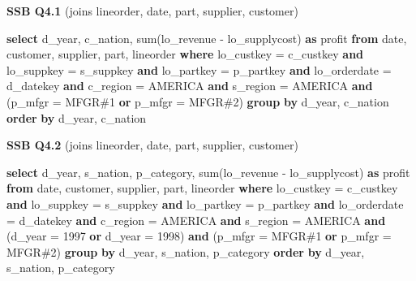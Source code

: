 \documentclass[
  10pt,
]{article}
\newenvironment{Shaded}{}{}
\newcommand{\DataTypeTok}[1]{\textcolor[rgb]{0.56,0.13,0.00}{#1}}
\newcommand{\DecValTok}[1]{\textcolor[rgb]{0.25,0.63,0.44}{#1}}
\newcommand{\FunctionTok}[1]{\textcolor[rgb]{0.02,0.16,0.49}{#1}}
\newcommand{\KeywordTok}[1]{\textcolor[rgb]{0.00,0.44,0.13}{\textbf{#1}}}
\newcommand{\NormalTok}[1]{#1}
\newcommand{\OperatorTok}[1]{\textcolor[rgb]{0.40,0.40,0.40}{#1}}
\newcommand{\StringTok}[1]{\textcolor[rgb]{0.25,0.44,0.63}{#1}}
\begin{document}
\textbf{SSB Q4.1} (joins lineorder, date, part, supplier, customer)

\begin{Shaded}
\begin{Highlighting}[]
\KeywordTok{select}\NormalTok{ d\_year, c\_nation, }\FunctionTok{sum}\NormalTok{(lo\_revenue }\OperatorTok{{-}}\NormalTok{ lo\_supplycost) }\KeywordTok{as}\NormalTok{ profit}
\KeywordTok{from} \DataTypeTok{date}\NormalTok{, customer, supplier, part, lineorder}
\KeywordTok{where}\NormalTok{ lo\_custkey }\OperatorTok{=}\NormalTok{ c\_custkey }\KeywordTok{and}\NormalTok{ lo\_suppkey }\OperatorTok{=}\NormalTok{ s\_suppkey }\KeywordTok{and}\NormalTok{ lo\_partkey }\OperatorTok{=}\NormalTok{ p\_partkey }\KeywordTok{and}\NormalTok{ lo\_orderdate }\OperatorTok{=}\NormalTok{ d\_datekey }\KeywordTok{and}\NormalTok{ c\_region }\OperatorTok{=} \StringTok{\textquotesingle{}AMERICA\textquotesingle{}} \KeywordTok{and}\NormalTok{ s\_region }\OperatorTok{=} \StringTok{\textquotesingle{}AMERICA\textquotesingle{}} \KeywordTok{and}\NormalTok{ (p\_mfgr }\OperatorTok{=} \StringTok{\textquotesingle{}MFGR\#1\textquotesingle{}} \KeywordTok{or}\NormalTok{ p\_mfgr }\OperatorTok{=} \StringTok{\textquotesingle{}MFGR\#2\textquotesingle{}}\NormalTok{)}
\KeywordTok{group} \KeywordTok{by}\NormalTok{ d\_year, c\_nation}
\KeywordTok{order} \KeywordTok{by}\NormalTok{ d\_year, c\_nation}
\end{Highlighting}
\end{Shaded}

\textbf{SSB Q4.2} (joins lineorder, date, part, supplier, customer)

\begin{Shaded}
\begin{Highlighting}[]
\KeywordTok{select}\NormalTok{ d\_year, s\_nation, p\_category, }\FunctionTok{sum}\NormalTok{(lo\_revenue }\OperatorTok{{-}}\NormalTok{ lo\_supplycost) }\KeywordTok{as}\NormalTok{ profit}
\KeywordTok{from} \DataTypeTok{date}\NormalTok{, customer, supplier, part, lineorder}
\KeywordTok{where}\NormalTok{ lo\_custkey }\OperatorTok{=}\NormalTok{ c\_custkey }\KeywordTok{and}\NormalTok{ lo\_suppkey }\OperatorTok{=}\NormalTok{ s\_suppkey }\KeywordTok{and}\NormalTok{ lo\_partkey }\OperatorTok{=}\NormalTok{ p\_partkey }\KeywordTok{and}\NormalTok{ lo\_orderdate }\OperatorTok{=}\NormalTok{ d\_datekey }\KeywordTok{and}\NormalTok{ c\_region }\OperatorTok{=} \StringTok{\textquotesingle{}AMERICA\textquotesingle{}} \KeywordTok{and}\NormalTok{ s\_region }\OperatorTok{=} \StringTok{\textquotesingle{}AMERICA\textquotesingle{}} \KeywordTok{and}\NormalTok{ (d\_year }\OperatorTok{=} \DecValTok{1997} \KeywordTok{or}\NormalTok{ d\_year }\OperatorTok{=} \DecValTok{1998}\NormalTok{) }\KeywordTok{and}\NormalTok{ (p\_mfgr }\OperatorTok{=} \StringTok{\textquotesingle{}MFGR\#1\textquotesingle{}} \KeywordTok{or}\NormalTok{ p\_mfgr }\OperatorTok{=} \StringTok{\textquotesingle{}MFGR\#2\textquotesingle{}}\NormalTok{)}
\KeywordTok{group} \KeywordTok{by}\NormalTok{ d\_year, s\_nation, p\_category}
\KeywordTok{order} \KeywordTok{by}\NormalTok{ d\_year, s\_nation, p\_category}
\end{Highlighting}
\end{Shaded}
\end{document}
